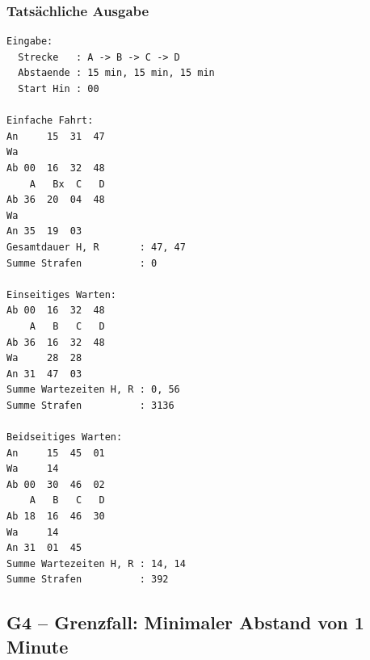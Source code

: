 \documentclass[12pt,a4paper]{article}
\begin{document}
\hfill
\begin{minipage}[t]{0.48\textwidth}
\scriptsize
\subsubsection*{Tatsächliche Ausgabe}
\begin{lstlisting}
Eingabe:
  Strecke   : A -> B -> C -> D
  Abstaende : 15 min, 15 min, 15 min
  Start Hin : 00

Einfache Fahrt:
An     15  31  47
Wa
Ab 00  16  32  48
    A   Bx  C   D
Ab 36  20  04  48
Wa
An 35  19  03
Gesamtdauer H, R       : 47, 47
Summe Strafen          : 0

Einseitiges Warten:
Ab 00  16  32  48
    A   B   C   D
Ab 36  16  32  48
Wa     28  28
An 31  47  03
Summe Wartezeiten H, R : 0, 56
Summe Strafen          : 3136

Beidseitiges Warten:
An     15  45  01
Wa     14
Ab 00  30  46  02
    A   B   C   D
Ab 18  16  46  30
Wa     14
An 31  01  45
Summe Wartezeiten H, R : 14, 14
Summe Strafen          : 392
\end{lstlisting}
\end{minipage}

\subsection{G4 – Grenzfall: Minimaler Abstand von 1 Minute}
\label{test:g4}
\end{document}
